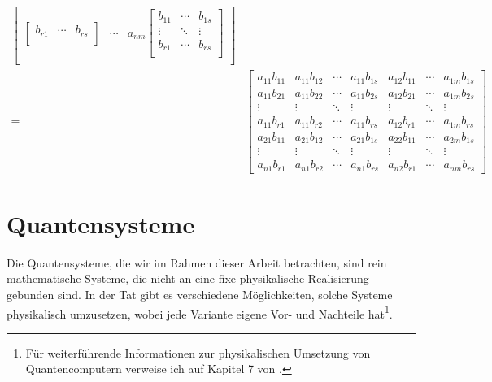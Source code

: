 \begin{align*}
\begin{bmatrix}
\begin{bmatrix}
            b_{r1} & \cdots  & b_{rs} \\
        \end{bmatrix} 
        & \cdots  & a_{nm}\begin{bmatrix}
            b_{11} & \cdots & b_{1s} \\
            \vdots & \ddots  & \vdots \\
            b_{r1} & \cdots  & b_{rs} \\
        \end{bmatrix} \\
    \end{bmatrix} \\[0.5cm]
    =
    &\begin{bmatrix}
        a_{11}b_{11} & a_{11}b_{12} & \cdots & a_{11}b_{1s} & a_{12}b_{11} & \cdots & a_{1m}b_{1s} \\
        a_{11}b_{21} & a_{11}b_{22} & \cdots & a_{11}b_{2s} & a_{12}b_{21} & \cdots & a_{1m}b_{2s} \\
        \vdots & \vdots & \ddots & \vdots & \vdots & \ddots & \vdots \\
        a_{11}b_{r1} & a_{11}b_{r2} & \cdots & a_{11}b_{rs} & a_{12}b_{r1} & \cdots & a_{1m}b_{rs} \\ 
        a_{21}b_{11} & a_{21}b_{12} & \cdots & a_{21}b_{1s} & a_{22}b_{11} & \cdots & a_{2m}b_{1s} \\
        \vdots & \vdots & \ddots & \vdots & \vdots & \ddots & \vdots \\
        a_{n1}b_{r1} & a_{n1}b_{r2} & \cdots & a_{n1}b_{rs} & a_{n2}b_{r1} & \cdots & a_{nm}b_{rs}
    \end{bmatrix}
\end{align*}

\section{Quantensysteme}
Die Quantensysteme, die wir im Rahmen dieser Arbeit betrachten, sind rein mathematische Systeme, die nicht an eine fixe physikalische Realisierung gebunden sind. In der Tat gibt es verschiedene Möglichkeiten, solche Systeme physikalisch umzusetzen, wobei jede Variante eigene Vor- und Nachteile hat\footnote{Für weiterführende Informationen zur physikalischen Umsetzung von Quantencomputern verweise ich auf Kapitel 7 von \cite{QC}.}.

